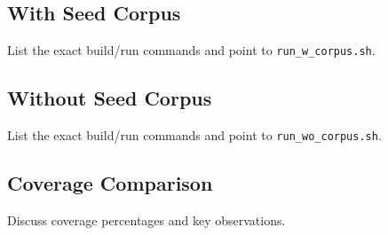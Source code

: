 \subsection{With Seed Corpus}

List the exact build/run commands and point to \texttt{run\_w\_corpus.sh}.

\subsection{Without Seed Corpus}
List the exact build/run commands and point to \texttt{run\_wo\_corpus.sh}.

\subsection{Coverage Comparison}
Discuss coverage percentages and key observations.
